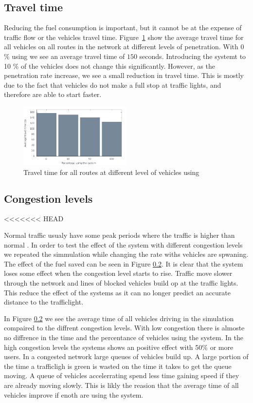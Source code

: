 \subsection{Travel time}
Reducing the fuel consumption is important, but it cannot be at the expense of traffic flow or the vehicles travel time.
Figure~\ref{fig:TestResults:combinedTime} show the average travel time for all vehicles on all routes in the network at different levels of penetration.
With 0 \% using \tech we see an average travel time of $150$ seconds. 
Introducing the systemt to 10 \% of the vehicles does not change this significantly. 
However, as the penetration rate increase, we see a small reduction in travel time. 
This is mostly due to the fact that vehicles do not make a full stop at traffic lights, and therefore are able to start faster.

\begin{figure}[h]
\includegraphics[width=0.5\textwidth]{../images/tp0c1_0/combinedTime.png}
\caption{Travel time for all routes at different level of vehicles using \tech}
\label{fig:TestResults:combinedTime}
\end{figure}

\subsection{Congestion levels}
<<<<<<< HEAD

Normal traffic usualy have some peak periods where the traffic is higher than normal \cite{Vejdir}. In order to test the effect of the system with different congestion levels we repeated the simmulation while changing the rate withs vehicles are spwaning. The effect of the fuel saved can be seen in Figure \ref{}. It is clear that the system loses some effect when the congestion level starts to rise. Traffic move slower through the network and lines of blocked vehicles build op at the traffic lights. This reduce the effect of the systems as it can no longer predict an accurate distance to the trafficlight.

In Figure \ref{} we see the average time of all vehicles driving in the simulation compaired to the diffrent congestion levels. With low congestion there is almoste no diffrence in the time and the percentance of vehicles using the system. In the high congestion levels the systems shows an positive effect with 50\% or more users. In a congested network large queues of vehicles build up. A large portion of the time a trafficligh is green is wasted on the time it takes to get the queue moving. A queue of vehicles accelerrating spend less time gaining speed if they are already moving slowly. This is likly the reasion that the average time of all vehicles improve if enoth are using the system.




